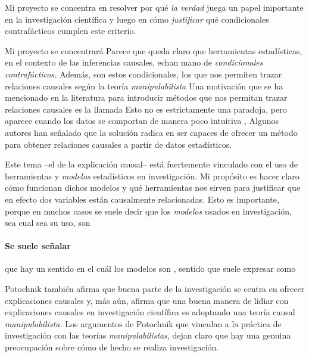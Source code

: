 Mi proyecto se concentra en resolver por qué \emph{la verdad} juega un papel importante en la investigación científica y luego en cómo \emph{justificar} qué condicionales contrafácticos cumplen este criterio.

Mi proyecto se concentrará Parece que queda claro que herramientas estadísticas, en el contexto de las inferencias causales, echan mano de \emph{condicionales contrafácticos.}
Además, son estos condicionales, los que nos permiten trazar relaciones causales según la teoría \emph{manipulabilista}
Una motivación que se ha mencionado en la literatura para introducir métodos que nos permitan trazar relaciones causales es la llamada 
Esto no es estrictamente una paradoja, pero aparece cuando los datos se comportan de manera poco intuitiva \parencite[p.~13]{Hajek2016-HAJOHO},
Algunos autores han señalado que la solución radica en ser capaces de ofrecer un método para obtener relaciones causales a partir de datos estadísticos.

Este tema --el de la explicación causal-- está fuertemente vinculado con el uso de herramientas y \emph{modelos} estadísticos en investigación.
Mi propósito es hacer claro cómo funcionan dichos modelos y qué herramientas nos sirven para justificar que en efecto dos variables están causalmente relacionadas.
Esto es importante, porque en muchos casos se suele decir que los \emph{modelos} usados en investigación, sea cual sea su uso, son 

\paragraph{Se suele señalar} que hay un sentido en el cuál los modelos son , sentido que suele expresar como  \parencite[p.~18, énfasis agregado]{Potochnik2017-POTIAT-3}

Potochnik también afirma que buena parte de la investigación se centra en ofrecer explicaciones causales y, más aún, afirma que una buena manera de lidiar con explicaciones causales en investigación científica es adoptando una teoría causal \emph{manipulabilista.}
Los argumentos de Potochnik que vinculan a la práctica de investigación con las teorías \emph{manipulabilistas}, dejan claro que hay una genuina preocupación sobre cómo de hecho se realiza investigación.

